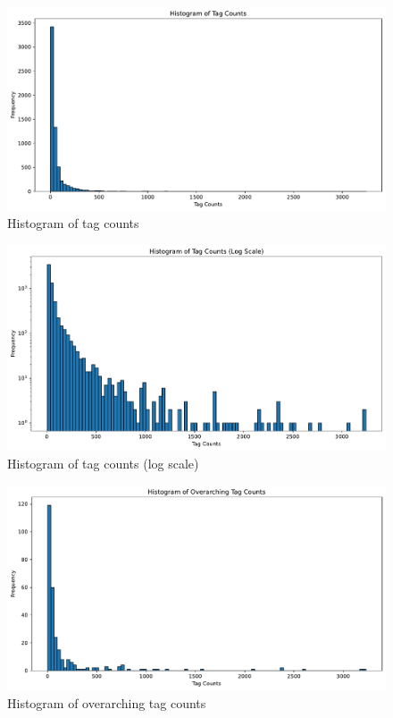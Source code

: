 \begin{figure}[h]
    \centering
    \includegraphics[width=\textwidth]{figures/histogram_tag_counts.pdf}
    \caption{Histogram of tag counts}
    \label{fig:histogram_tag_counts}
\end{figure}

\begin{figure}[h]
    \centering
    \includegraphics[width=\textwidth]{figures/histogram_tag_counts_log.pdf}
    \caption{Histogram of tag counts (log scale)}
    \label{fig:histogram_tag_counts_log}
\end{figure}

\begin{figure}[h]
    \centering
    \includegraphics[width=\textwidth]{figures/histogram_overarching_tag_counts.pdf}
    \caption{Histogram of overarching tag counts}
    \label{fig:histogram_overarching_tag_counts}
\end{figure}

